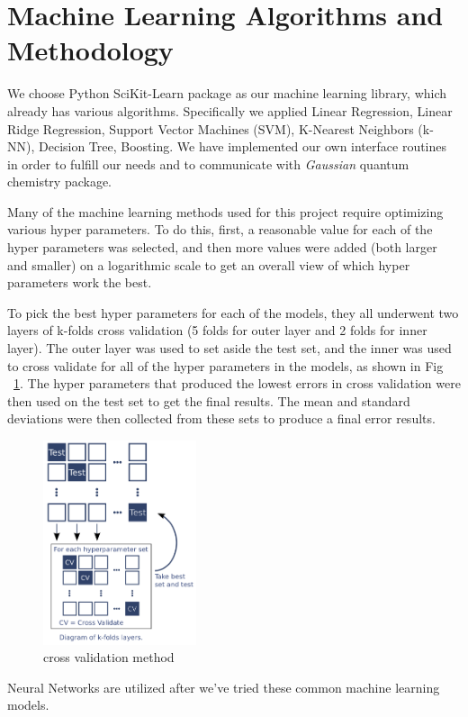 \section{Machine Learning Algorithms and Methodology}


\noindent We choose Python SciKit-Learn package\cite{scikit-learn} as our machine learning library, which already has various algorithms. Specifically we applied Linear Regression, Linear Ridge Regression, Support Vector Machines (SVM), K-Nearest Neighbors (k-NN), Decision Tree, Boosting. We have implemented our own interface routines in order to fulfill our needs and to communicate with \textit{Gaussian} quantum chemistry package.

Many of the machine learning methods used for this project require optimizing various hyper parameters. To do this, first, a reasonable value for each of the hyper parameters was selected, and then more values were added (both larger and smaller) on a logarithmic scale to get an overall view of which hyper parameters work the best.

To pick the best hyper parameters for each of the models, they all underwent two layers of k-folds cross validation (5 folds for outer layer and 2 folds for inner layer). The outer layer was used to set aside the test set, and the inner was used to cross validate for all of the hyper parameters in the models, as shown in Fig ~\ref{crossvalidation}. The hyper parameters that produced the lowest errors in cross validation were then used on the test set to get the final results. The mean and standard deviations were then collected from these sets to produce a final error results. 

\begin{figure}[H]
\begin{center}
\includegraphics [width=0.4\textwidth]{crossvalidation.png}
\caption{cross validation method}\label{crossvalidation}
\end{center}
\end{figure}

Neural Networks are utilized after we've tried these common machine learning models. 
